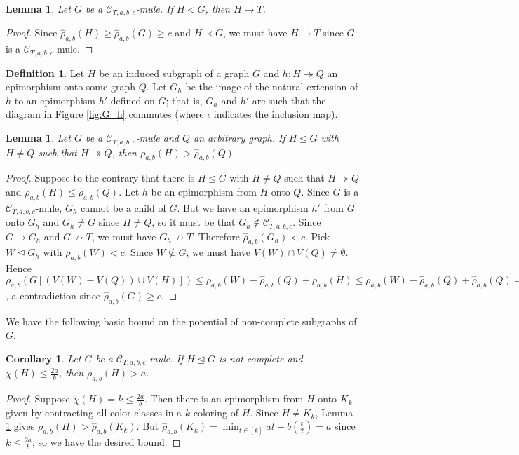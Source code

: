 \documentclass[12pt]{amsart}
\theoremstyle{plain}
\newtheorem{lem}[thm]{Lemma}
\newtheorem{cor}[thm]{Corollary}
\theoremstyle{definition}
\newtheorem{defn}{Definition}
\theoremstyle{remark}
\newcommand{\fancy}[1]{\mathcal{#1}}
\newcommand{\C}{\fancy{C}}
\newcommand{\surj}{\twoheadrightarrow}
\newcommand{\funcsurj}[3]{#1\colon #2 \surj #3}
\newcommand{\irange}[1]{\left[#1\right]}
\newcommand{\parens}[1]{\left( #1 \right)}
\newcommand{\brackets}[1]{\left[ #1 \right]}
\begin{document}
\begin{lem}
Let $G$ be a $\C_{T,a,b,c}$-mule.  If $H \lhd G$, then $H \rightarrow T$.
\end{lem}
\begin{proof}
Since $\hat{\rho}_{a,b}(H) \ge \hat{\rho}_{a,b}(G) \ge c$ and $H \prec G$, we must have $H \rightarrow T$ since $G$ is a $\C_{T,a,b,c}$-mule.
\end{proof}

\begin{defn}\label{InducedHomomorphism}
Let $H$ be an induced subgraph of a graph $G$ and $\funcsurj{h}{H}{Q}$ an epimorphism onto some graph $Q$. Let $G_h$ be the image of the natural extension of $h$ to an epimorphism $h'$ defined on $G$; that is, $G_h$ and $h'$ are such that the diagram in Figure \ref{fig:G_h} commutes (where $\iota$ indicates the inclusion map).
\end{defn}

\begin{lem}\label{ArbitraryQ}
Let $G$ be a $\C_{T,a,b,c}$-mule and $Q$ an arbitrary graph.  If $H \unlhd G$ with $H \ne Q$ such that $H \surj Q$, then $\rho_{a,b}(H) > \hat{\rho}_{a,b}(Q)$.
\end{lem}
\begin{proof}
Suppose to the contrary that there is $H \unlhd G$ with $H \ne Q$ such that $H \surj Q$ and $\rho_{a,b}(H) \le \hat{\rho}_{a,b}(Q)$.  
Let $h$ be an epimorphism from $H$ onto $Q$. Since $G$ is a $\C_{T,a,b,c}$-mule, $G_h$ cannot be a child of $G$.  But we have an epimorphism $h'$ from $G$ onto $G_h$ and $G_h \ne G$ since $H \ne Q$, so it must be that $G_h \not \in \C_{T,a,b,c}$.  Since $G \rightarrow G_h$ and $G \not \rightarrow T$, we must have $G_h \not \rightarrow T$.  Therefore $\hat{\rho}_{a,b}(G_h) < c$.  Pick $W \unlhd G_h$ with $\rho_{a,b}(W) < c$.  Since $W \not \subseteq G$, we must have $V(W) \cap V(Q) \ne \emptyset$.  Hence $\rho_{a,b}\parens{G\brackets{(V(W) - V(Q)) \cup V(H)}} \le \rho_{a,b}(W) - \hat{\rho}_{a,b}(Q) + \rho_{a,b}(H) \le  \rho_{a,b}(W) - \hat{\rho}_{a,b}(Q) + \hat{\rho}_{a,b}(Q) = \rho_{a,b}(W) < c$, a contradiction since $\hat{\rho}_{a,b}(G) \ge c$.
\end{proof}

We have the following basic bound on the potential of non-complete subgraphs of $G$.
\begin{cor}\label{CompleteQ}
Let $G$ be a $\C_{T,a,b,c}$-mule. If $H \unlhd G$ is not complete and $\chi(H) \le \frac{2a}{b}$, then $\rho_{a,b}(H) > a$.
\end{cor}
\begin{proof}
Suppose $\chi(H) = k \le \frac{2a}{b}$.  Then there is an epimorphism from $H$ onto $K_k$ given by contracting all color classes in a $k$-coloring of $H$.  Since $H \ne K_k$, Lemma \ref{ArbitraryQ} gives
$\rho_{a,b}(H) > \hat{\rho}_{a,b}(K_k)$.  But $\hat{\rho}_{a,b}(K_k) = \min_{t \in \irange{k}} at - b\binom{t}{2} = a$ since $k \le \frac{2a}{b}$, so we have the desired bound.
\end{proof}
\end{document}
